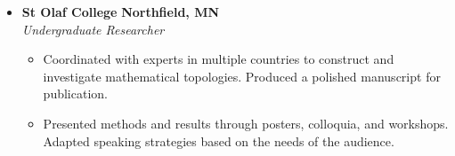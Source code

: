 \begin{itemize}[leftmargin=\parindent]
\begin{itemize}
        \end{itemize}

    \item[]
        \headerrow
        {\textbf{St Olaf College}}
        {\textbf{Northfield, MN}}
        \\
        \headerrow
        {\emph{Undergraduate Researcher}}
        {\emph{}}
        \begin{itemize}
            \item Coordinated with experts in multiple countries to construct and investigate mathematical topologies. Produced a polished manuscript for publication. 
            \item Presented methods and results through posters, colloquia, and workshops. Adapted speaking strategies based on the needs of the audience. 
        \end{itemize}

\end{itemize}










